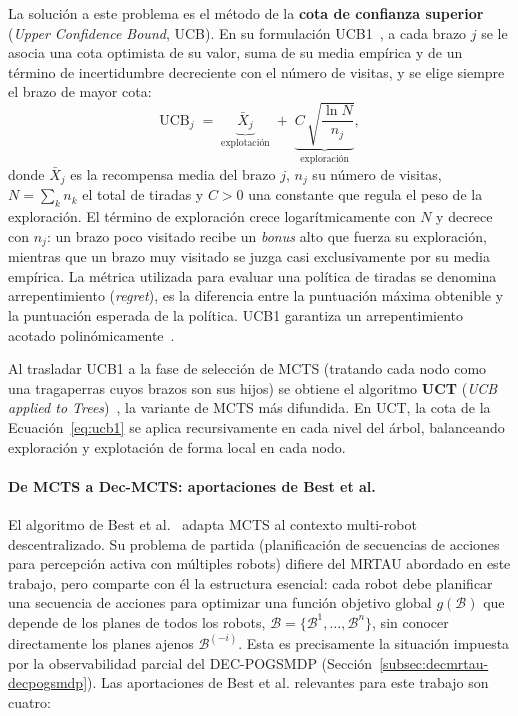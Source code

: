 La solución a este problema es el método de la \textbf{cota de confianza superior} (\emph{Upper Confidence Bound}, UCB). En su formulación UCB1~\cite{auer2002ucb}, a cada brazo $j$ se le asocia una cota optimista de su valor, suma de su media empírica y de un término de incertidumbre decreciente con el número de visitas, y se elige siempre el brazo de mayor cota:
\begin{equation} \label{eq:ucb1}
    \mathrm{UCB}_j \;=\; \underbrace{\bar{X}_j}_{\text{explotación}} \;+\; \underbrace{C\,\sqrt{\frac{\ln N}{n_j}}}_{\text{exploración}},
\end{equation}
donde $\bar{X}_j$ es la recompensa media del brazo $j$, $n_j$ su número de visitas, $N=\sum_k n_k$ el total de tiradas y $C>0$ una constante que regula el peso de la exploración. El término de exploración crece logarítmicamente con $N$ y decrece con $n_j$: un brazo poco visitado recibe un \emph{bonus} alto que fuerza su exploración, mientras que un brazo muy visitado se juzga casi exclusivamente por su media empírica. La métrica utilizada para evaluar una política de tiradas se denomina arrepentimiento (\textit{regret}), es la diferencia entre la puntuación máxima obtenible y la puntuación esperada de la política. UCB1 garantiza un arrepentimiento acotado polinómicamente~\cite{auer2002ucb}.




Al trasladar UCB1 a la fase de selección de MCTS (tratando cada nodo como una tragaperras cuyos brazos son sus hijos) se obtiene el algoritmo \textbf{UCT} (\emph{UCB applied to Trees})~\cite{kocsis2006bandit}, la variante de MCTS más difundida. En UCT, la cota de la Ecuación~\eqref{eq:ucb1} se aplica recursivamente en cada nivel del árbol, balanceando exploración y explotación de forma local en cada nodo.

\paragraph{De MCTS a Dec-MCTS: aportaciones de Best et al.}
El algoritmo de Best et al.~\cite{best2019decmcts} adapta MCTS al contexto multi-robot descentralizado. Su problema de partida (planificación de secuencias de acciones para percepción activa con múltiples robots) difiere del MRTAU abordado en este trabajo, pero comparte con él la estructura esencial: cada robot debe planificar una secuencia de acciones para optimizar una función objetivo global $g(\mathcal{B})$ que depende de los planes de todos los robots, $\mathcal{B}=\{\mathcal{B}^{1},\dots,\mathcal{B}^{n}\}$, sin conocer directamente los planes ajenos $\mathcal{B}^{(-i)}$. Esta es precisamente la situación impuesta por la observabilidad parcial del DEC-POGSMDP (Sección~\ref{subsec:decmrtau-decpogsmdp}). Las aportaciones de Best et al. relevantes para este trabajo son cuatro:

